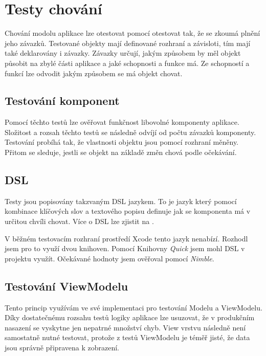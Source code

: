 \section{Testy chování}\label{testovani-bdd}

Chování modolu aplikace lze otestovat pomocí otestovat tak, že se zkoumá plnění jeho závazků.
Testované objekty mají definované rozhraní a závisloti, tím mají také deklarovány i závazky.
Závazky určují, jakým způsobem by měl objekt působit na zbylé části aplikace a jaké schopnosti a funkce má.
Ze schopností a funkcí lze odvodit jakým způsobem se má objekt chovat.

\subsection{Testování komponent}

Pomocí těchto testů lze ověřovat funkčnost libovolné komponenty aplikace.
Složitost a rozsah těchto testů se následně odvíjí od počtu závazků komponenty.
Testování probíhá tak, že vlastnosti objektu jsou pomocí rozhraní měněny.
Přitom se sleduje, jestli se objekt na základě změn chová podle očekávání. \cite{objcio-bdd}

\subsection{DSL}

Testy jsou popisovány takzvaným DSL jazykem.
To je jazyk který pomocí kombinace klíčových slov a textového popisu definuje jak se komponenta má v určitou chvíli chovat.
Více o DSL lze zjistit na \cite{petrikainulainen-dsl}.

V běžném testovacím rozhraní prostředí Xcode tento jazyk nenabízí.
Rozhodl jsem pro to využí dvou knihoven.
Pomocí Knihovny \textit{Quick} jsem mohl DSL v projektu využít.
Očekávané hodnoty jsem ověřoval pomocí \textit{Nimble}.

\subsection{Testování ViewModelu}

Tento princip využívám ve své implementaci pro testování Modelu a ViewModelu.
Díky dostatečnému rozsahu testů logiky aplikace lze usuzovat, že v produkčním nasazení se vyskytne jen nepatrné množství chyb.
View vrstvu následně není samostatně nutné testovat, protože z testů ViewModelu je téměř jisté, že data jsou správně připravena k zobrazení.


